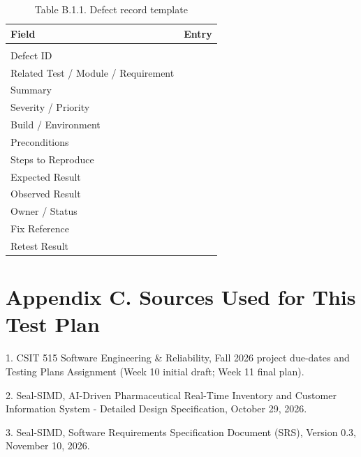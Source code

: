 {\def\LTcaptype{none} %
\begin{longtable}[]{|
  >{\raggedright\arraybackslash}m{}|
  >{\raggedright\arraybackslash}m{}|}
\hline
\begin{minipage}[c]{\linewidth}\raggedright
\textbf{Field}
\end{minipage} & \begin{minipage}[c]{\linewidth}\raggedright
\textbf{Entry}
\end{minipage} \\
\hline
\endhead

\caption*{Table B.1.1. Defect record template}\\
\endlastfoot
Defect ID & \\ \hline
Related Test / Module / Requirement & \\ \hline
Summary & \\ \hline
Severity / Priority & \\ \hline
Build / Environment & \\ \hline
Preconditions & \\ \hline
Steps to Reproduce & \\ \hline
Expected Result & \\ \hline
Observed Result & \\ \hline
Owner / Status & \\ \hline
Fix Reference & \\ \hline
Retest Result & \\ \hline
\end{longtable}
}

\clearpage
\section{Appendix C. Sources Used for This Test Plan}\label{appendix-c.-sources-used-for-this-test-plan}

1. CSIT 515 Software Engineering \& Reliability, Fall 2026 project due-dates and Testing Plans Assignment (Week 10 initial draft; Week 11 final plan).

2. Seal-SIMD, AI-Driven Pharmaceutical Real-Time Inventory and Customer Information System - Detailed Design Specification, October 29, 2026.

3. Seal-SIMD, Software Requirements Specification Document (SRS), Version 0.3, November 10, 2026.



